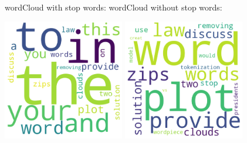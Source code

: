 \documentclass{article}
\begin{document}
wordCloud with stop words: \hspace*{1.6in} wordCloud without stop words:

\includegraphics[width=200]{images/wordCloud.png}
\hspace*{0.5in}
\includegraphics[width=200]{images/wordCloudNoStopWords.png}
\end{document}
